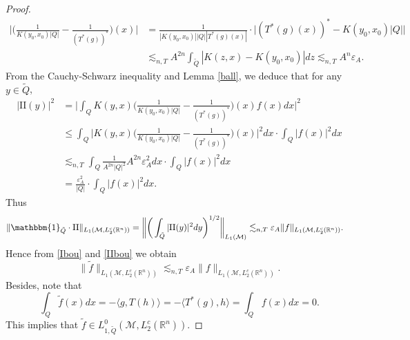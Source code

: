 \documentclass[oneside,english,a4wide]{amsart}
\numberwithin{equation}{section}
\numberwithin{figure}{section}
\theoremstyle{plain}
\theoremstyle{plain}
\theoremstyle{definition}
\theoremstyle{plain}
\theoremstyle{remark}
\theoremstyle{definition}
\theoremstyle{remark}
\theoremstyle{definition}
\newcommand{\8}{\infty}
\begin{document}
\begin{proof}
    \begin{equation*}
   	    \begin{aligned}
   		    \bigg|\biggl(\frac{1}{{K(y_0,x_0)}|Q|}-\frac{1}{(T^*(g))^*}\biggr)(x)\bigg|{}
   		    &=\frac{1}{|{K(y_0,x_0)}||Q||{T^*(g)(x)}|}\cdot\Big|(T^*(g)(x))^*-{K(y_0,x_0)}|Q|\Big|\\
   		    &\lesssim_{n,T} A^{2n}\int_{\tilde{Q}} |K(z,x)-K(y_0,x_0)|dz
   		    \lesssim_{n,T} A^n\varepsilon_A.
   	    \end{aligned}
   \end{equation*}
   From the Cauchy-Schwarz inequality and Lemma \ref{ball}, we deduce that for any $y\in \tilde{Q}$, 
    \begin{equation*}
    	\begin{aligned}
    		|\mathrm{II}(y)|^2{}
    		&=\bigg|\int_{Q}K(y,x)\biggl(\frac{1}{{K(y_0,x_0)}|Q|}-\frac{1}{(T^*(g))^*}\biggr)(x)f(x)dx\bigg|^2\\
    		&\le \int_{Q}\bigg|K(y,x)\biggl(\frac{1}{{K(y_0,x_0)}|Q|}-\frac{1}{(T^*(g))^*}\biggr)(x)\bigg|^2 dx\cdot \int_{Q}|f(x)|^2dx\\
    		&\lesssim_{n,T}\int_{Q}\frac{1}{A^{2n}|Q|^2}A^{2n}\varepsilon_A^2 dx\cdot \int_{Q}|f(x)|^2dx\\
    		&=\frac{\varepsilon_A^2}{|Q|}\cdot \int_{Q}|f(x)|^2dx.
    	\end{aligned}
    \end{equation*}
    Thus
    \begin{equation}\label{IIbou}
    	\begin{aligned}
    	    \|\mathbbm{1}_{\tilde{Q}}\cdot\mathrm{II}\|_{L_1(\mathcal{M},L_2^c(\mathbb{R}^n))}=\bigg\|\bigg(\int_{\tilde{Q}} |\mathrm{II}(y)|^2dy\bigg)^{1/2}\bigg\|_{L_1(\mathcal{M})}{}
    	    &\lesssim_{n,T} \varepsilon_A \|f\|_{L_1(\mathcal{M},L_2^c(\mathbb{R}^n))}.
    	\end{aligned}
    \end{equation}
    Hence from \eqref{Ibou} and \eqref{IIbou} we obtain
    \begin{equation*}
    	\|\tilde{f}\|_{L_1(\mathcal{M},L_2^c(\mathbb{R}^n))}\lesssim_{n,T} \varepsilon_A \|f\|_{L_1(\mathcal{M},L_2^c(\mathbb{R}^n))}.
    \end{equation*}
	Besides, note that 
	\begin{equation*}
		\int_Q \tilde{f}(x)dx=-\langle g,T(h)\rangle=-\langle T^*(g),h\rangle=\int_Q f(x)dx=0.
	\end{equation*}
	This implies that $\tilde{f}\in L^0_{1,\tilde{Q}}(\mathcal{M},L_2^c(\mathbb{R}^n))$.
\end{proof}
\end{document}
